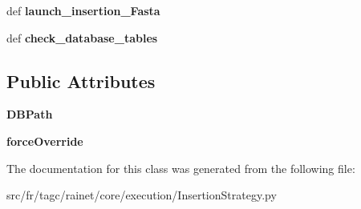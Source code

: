 \begin{DoxyCompactItemize}
\item 
\hypertarget{classsrc_1_1fr_1_1tagc_1_1rainet_1_1core_1_1execution_1_1InsertionStrategy_1_1InsertionStrategy_a43f45e6ef3409076e0fd2264ef72b1d9}{def {\bfseries launch\-\_\-insertion\-\_\-\-Fasta}}\label{classsrc_1_1fr_1_1tagc_1_1rainet_1_1core_1_1execution_1_1InsertionStrategy_1_1InsertionStrategy_a43f45e6ef3409076e0fd2264ef72b1d9}

\item 
\hypertarget{classsrc_1_1fr_1_1tagc_1_1rainet_1_1core_1_1execution_1_1InsertionStrategy_1_1InsertionStrategy_aab6a63e5f9e354608d6b6770f40a51d2}{def {\bfseries check\-\_\-database\-\_\-tables}}\label{classsrc_1_1fr_1_1tagc_1_1rainet_1_1core_1_1execution_1_1InsertionStrategy_1_1InsertionStrategy_aab6a63e5f9e354608d6b6770f40a51d2}

\end{DoxyCompactItemize}
\subsection*{Public Attributes}
\begin{DoxyCompactItemize}
\item 
\hypertarget{classsrc_1_1fr_1_1tagc_1_1rainet_1_1core_1_1execution_1_1InsertionStrategy_1_1InsertionStrategy_ae5da54a1355b5e93dd5a02b63b83a3bd}{{\bfseries D\-B\-Path}}\label{classsrc_1_1fr_1_1tagc_1_1rainet_1_1core_1_1execution_1_1InsertionStrategy_1_1InsertionStrategy_ae5da54a1355b5e93dd5a02b63b83a3bd}

\item 
\hypertarget{classsrc_1_1fr_1_1tagc_1_1rainet_1_1core_1_1execution_1_1InsertionStrategy_1_1InsertionStrategy_a3187f3fe8396253a147a511102489ac5}{{\bfseries force\-Override}}\label{classsrc_1_1fr_1_1tagc_1_1rainet_1_1core_1_1execution_1_1InsertionStrategy_1_1InsertionStrategy_a3187f3fe8396253a147a511102489ac5}

\end{DoxyCompactItemize}


The documentation for this class was generated from the following file\-:\begin{DoxyCompactItemize}
\item 
src/fr/tagc/rainet/core/execution/Insertion\-Strategy.\-py\end{DoxyCompactItemize}
